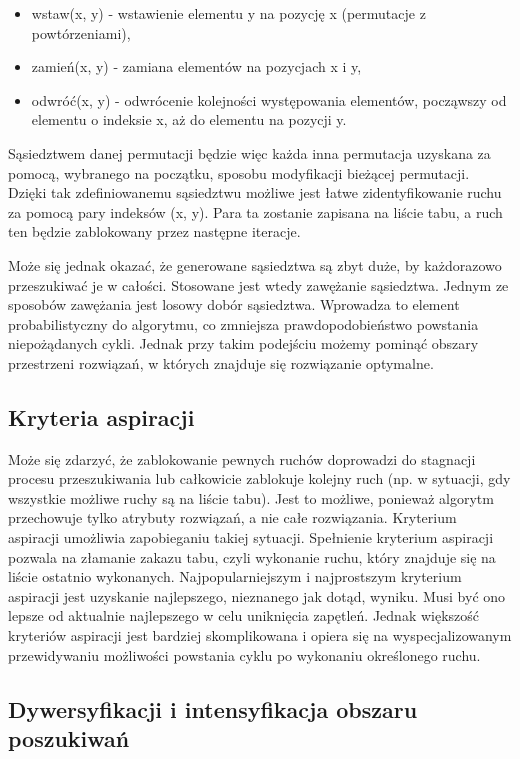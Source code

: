 \begin{itemize}
	\item wstaw(x, y) - wstawienie elementu y na pozycję x (permutacje z powtórzeniami),
	\item zamień(x, y) - zamiana elementów na pozycjach x i y,
	\item odwróć(x, y) - odwrócenie kolejności występowania elementów, począwszy od elementu o indeksie x, aż do elementu na pozycji y.
\end{itemize}

Sąsiedztwem danej permutacji będzie więc każda inna permutacja uzyskana za pomocą, wybranego na początku, sposobu modyfikacji bieżącej permutacji. Dzięki tak zdefiniowanemu sąsiedztwu możliwe jest łatwe zidentyfikowanie ruchu za pomocą pary indeksów (x, y). Para ta zostanie zapisana na liście tabu, a ruch ten będzie zablokowany przez następne iteracje.

Może się jednak okazać, że generowane sąsiedztwa są zbyt duże, by każdorazowo przeszukiwać je w całości. Stosowane jest wtedy zawężanie sąsiedztwa. Jednym ze sposobów zawężania jest losowy dobór sąsiedztwa. Wprowadza to element probabilistyczny do algorytmu, co zmniejsza prawdopodobieństwo powstania niepożądanych cykli. Jednak przy takim podejściu możemy pominąć obszary przestrzeni rozwiązań, w których znajduje się rozwiązanie optymalne.

\subsection{Kryteria aspiracji}

Może się zdarzyć, że zablokowanie pewnych ruchów doprowadzi do stagnacji procesu przeszukiwania lub całkowicie zablokuje kolejny ruch (np. w sytuacji, gdy wszystkie możliwe ruchy są na liście tabu). Jest to możliwe, ponieważ algorytm przechowuje tylko atrybuty rozwiązań, a nie całe rozwiązania. Kryterium aspiracji umożliwia zapobieganiu takiej sytuacji.
Spełnienie kryterium aspiracji pozwala na złamanie zakazu tabu, czyli wykonanie ruchu, który znajduje się na liście ostatnio wykonanych. Najpopularniejszym i najprostszym kryterium aspiracji jest uzyskanie najlepszego, nieznanego jak dotąd, wyniku. Musi być ono lepsze od aktualnie najlepszego w celu uniknięcia zapętleń. Jednak większość kryteriów aspiracji jest bardziej skomplikowana i opiera się na wyspecjalizowanym przewidywaniu możliwości powstania cyklu po wykonaniu określonego ruchu.

\subsection{Dywersyfikacji i intensyfikacja obszaru poszukiwań}

